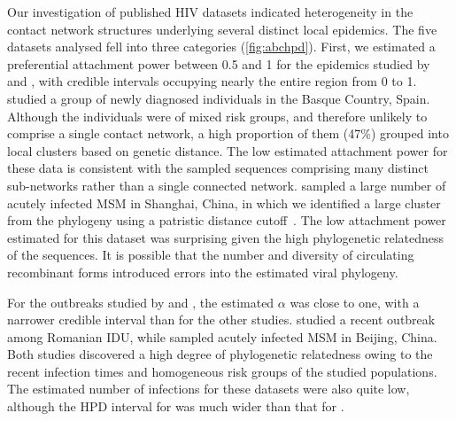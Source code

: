 \documentclass[12pt]{article}\usepackage[]{graphicx}\usepackage[]{color}
\begin{document}
Our investigation of published HIV datasets indicated heterogeneity in the
contact network structures underlying several distinct local epidemics. The
five datasets analysed fell into three categories (\cref{fig:abchpd}). First,
we estimated a preferential attachment power between 0.5 and 1 for the
epidemics studied by \textcite{cuevas2009hiv} and \textcite{li2015hiv}, with
credible intervals occupying nearly the entire region from 0 to 1.
\citeauthor{cuevas2009hiv} studied a group of newly diagnosed individuals in
the Basque Country, Spain. Although the individuals were of mixed risk groups,
and therefore unlikely to comprise a single contact network, a high proportion
of them (47\%) grouped into local clusters based on genetic distance. The low
estimated attachment power for these data is consistent with the sampled
sequences comprising many distinct sub-networks rather than a single connected
network. \citeauthor{li2015hiv} sampled a large number of acutely infected
\gls{MSM} in Shanghai, China, in which we identified a large cluster from the
phylogeny using a patristic distance cutoff~\autocite{poon2014impact}. The low
attachment power estimated for this dataset was surprising given the high
phylogenetic relatedness of the sequences. It is possible that the number and
diversity of circulating recombinant forms introduced errors into the estimated
viral phylogeny.

For the outbreaks studied by \textcite{niculescu2015recent} and
\textcite{wang2015targeting}, the estimated $\alpha$ was close to one, with a
narrower credible interval than for the other studies.
\citeauthor{niculescu2015recent} studied a recent outbreak among Romanian
\gls{IDU}, while \citeauthor{wang2015targeting} sampled acutely infected
\gls{MSM} in Beijing, China. Both studies discovered a high degree of
phylogenetic relatedness owing to the recent infection times and homogeneous
risk groups of the studied populations. The estimated number of infections for
these datasets were also quite low, although the \gls{HPD} interval for
\citeauthor{wang2015targeting} was much wider than that for
\citeauthor{niculescu2015recent}.
\end{document}
